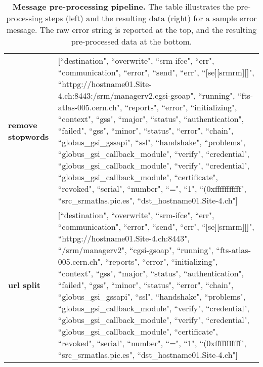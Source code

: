 \begin{table}
\begin{tabular}{p{1.9cm} | p{12cm}}
\textbf{remove stopwords} &
  {[}``destination", ``overwrite", ``srm-ifce", ``err", ``communication", ``error", ``send", ``err", ``{[}se{]}{[}srmrm{]}{[}{]}", ``httpg://hostname01.Site-4.ch:8443:/srm/managerv2,cgsi-gsoap", ``running", ``fts-atlas-005.cern.ch", ``reports", ``error", ``initializing", ``context", ``gss", ``major", ``status", ``authentication", ``failed", ``gss", ``minor", ``status", ``error", ``chain", ``globus\_gsi\_gssapi", ``ssl", ``handshake", ``problems", ``globus\_gsi\_callback\_module", ``verify", ``credential", ``globus\_gsi\_callback\_module", ``verify", ``credential", ``globus\_gsi\_callback\_module", ``certificate", ``revoked", ``serial", ``number", ``=", ``1", ``(0xfffffffffff", ``src\_srmatlas.pic.es", ``dst\_hostname01.Site-4.ch"{]} \\[0.2cm]
\textbf{url split} &
  {[}``destination", ``overwrite", ``srm-ifce", ``err", ``communication", ``error", ``send", ``err", ``{[}se{]}{[}srmrm{]}{[}{]}", ``httpg://hostname01.Site-4.ch:8443", ``/srm/managerv2", ``cgsi-gsoap", ``running", ``fts-atlas-005.cern.ch", ``reports", ``error", ``initializing", ``context", ``gss", ``major", ``status", ``authentication", ``failed", ``gss", ``minor", ``status", ``error", ``chain", ``globus\_gsi\_gssapi", ``ssl", ``handshake", ``problems", ``globus\_gsi\_callback\_module", ``verify", ``credential", ``globus\_gsi\_callback\_module", ``verify", ``credential", ``globus\_gsi\_callback\_module", ``certificate", ``revoked", ``serial", ``number", ``=", ``1", ``(0xfffffffffff", ``src\_srmatlas.pic.es", ``dst\_hostname01.Site-4.ch"{]}
\end{tabular}
\caption{\textbf{Message pre-processing pipeline.} The table illustrates the \mbox{pre-processing} steps (left) and the resulting data (right) for a sample error message. The raw error string is reported at the top, and the resulting pre-processed data at the bottom.}
\label{tab:preproc-pipeline}
\end{table}


